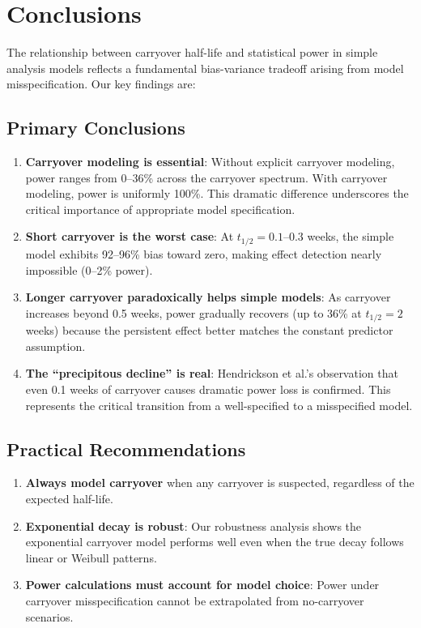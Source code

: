 \documentclass[11pt,a4paper]{article}
\begin{document}
\section{Conclusions}

The relationship between carryover half-life and statistical power in simple
analysis models reflects a fundamental bias-variance tradeoff arising from
model misspecification. Our key findings are:

\subsection{Primary Conclusions}

\begin{enumerate}
    \item \textbf{Carryover modeling is essential}: Without explicit carryover modeling,
          power ranges from 0--36\% across the carryover spectrum. With carryover
          modeling, power is uniformly 100\%. This dramatic difference underscores
          the critical importance of appropriate model specification.

    \item \textbf{Short carryover is the worst case}: At $t_{1/2} = 0.1$--$0.3$ weeks, the simple
          model exhibits 92--96\% bias toward zero, making effect detection nearly
          impossible (0--2\% power).

    \item \textbf{Longer carryover paradoxically helps simple models}: As carryover
          increases beyond 0.5 weeks, power gradually recovers (up to 36\% at
          $t_{1/2} = 2$ weeks) because the persistent effect better matches the constant
          predictor assumption.

    \item \textbf{The ``precipitous decline'' is real}: Hendrickson et al.'s observation
          that even 0.1 weeks of carryover causes dramatic power loss is confirmed.
          This represents the critical transition from a well-specified to a
          misspecified model.
\end{enumerate}

\subsection{Practical Recommendations}

\begin{enumerate}
    \item \textbf{Always model carryover} when any carryover is suspected, regardless
          of the expected half-life.

    \item \textbf{Exponential decay is robust}: Our robustness analysis shows the
          exponential carryover model performs well even when the true decay
          follows linear or Weibull patterns.

    \item \textbf{Power calculations must account for model choice}: Power under
          carryover misspecification cannot be extrapolated from no-carryover
          scenarios.
\end{enumerate}
\end{document}
